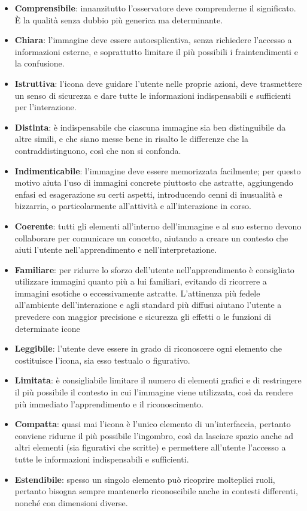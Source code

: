 \documentclass[11pt,a4paper]{article}
\begin{document}
\begin{itemize}
	\item \textbf{Comprensibile}: innanzitutto l'osservatore deve comprenderne il significato. È la qualità senza dubbio più generica ma determinante.
	\item \textbf{Chiara}:  l'immagine deve essere autoesplicativa, senza richiedere l'accesso a informazioni esterne, e soprattutto limitare il più possibili i fraintendimenti e la confusione.
	\item \textbf{Istruttiva}: l'icona deve guidare l'utente nelle proprie azioni, deve trasmettere un senso di sicurezza e dare tutte le informazioni indispensabili e sufficienti per l'interazione.
	\item \textbf{Distinta}: è indispensabile che ciascuna immagine sia ben distinguibile da altre simili, e che siano messe bene in risalto le differenze che la contraddistinguono, così che non si confonda.
	\item \textbf{Indimenticabile}: l'immagine deve essere memorizzata facilmente; per questo motivo aiuta l'uso di immagini concrete piuttosto che astratte, aggiungendo enfasi ed esagerazione su certi aspetti, introducendo cenni di inusualità e bizzarria, o particolarmente all'attività e all'interazione
in corso.
	\item \textbf{Coerente}: tutti gli elementi all'interno dell'immagine e al suo esterno devono collaborare per comunicare un concetto, aiutando a creare un contesto che aiuti l'utente nell'apprendimento e nell'interpretazione.
	\item \textbf{Familiare}: per ridurre lo sforzo dell'utente nell'apprendimento è consigliato utilizzare immagini quanto più a lui familiari, evitando di ricorrere a immagini esotiche o eccessivamente astratte. L'attinenza più fedele all'ambiente dell'interazione e agli standard più diffusi
aiutano l'utente a prevedere con maggior precisione e sicurezza gli effetti o le funzioni di determinate icone
	\item \textbf{Leggibile}: l'utente deve essere in grado di riconoscere ogni elemento che costituisce l'icona, sia esso testualo o figurativo.
	\item \textbf{Limitata}: è consigliabile limitare il numero di elementi grafici e di restringere il più possibile il contesto in cui l'immagine viene utilizzata, così da rendere più immediato l'apprendimento e il riconoscimento.
	\item \textbf{Compatta}: quasi mai l'icona è l'unico elemento di un'interfaccia, pertanto conviene ridurne il più possibile l'ingombro, così da lasciare spazio anche ad altri elementi (sia figurativi che scritte) e permettere all'utente l'accesso a tutte le informazioni indispensabili e sufficienti.
	\item \textbf{Estendibile}: spesso un singolo elemento può ricoprire molteplici ruoli, pertanto bisogna sempre mantenerlo riconoscibile anche in contesti differenti, nonché con dimensioni diverse.
\end{itemize}
\end{document}

